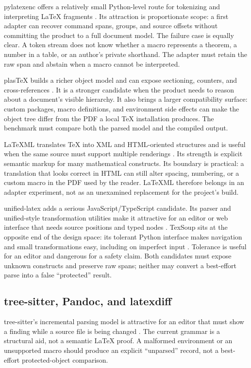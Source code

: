 pylatexenc offers a relatively small Python-level route for tokenizing and
interpreting LaTeX fragments \citep{pylatexenc2026}. Its attraction is
proportionate scope: a first adapter can recover command spans, groups, and
source offsets without committing the product to a full document model. The
failure case is equally clear. A token stream does not know whether a macro
represents a theorem, a number in a table, or an author's private shorthand.
The adapter must retain the raw span and abstain when a macro cannot be
interpreted.

plasTeX builds a richer object model and can expose sectioning, counters, and
cross-references \citep{plastex2026}. It is a stronger candidate when the
product needs to reason about a document's visible hierarchy. It also brings a
larger compatibility surface: custom packages, macro definitions, and
environment side effects can make the object tree differ from the PDF a local
TeX installation produces. The benchmark must compare both the parsed model
and the compiled output.

LaTeXML translates TeX into XML and HTML-oriented structures and is useful when
the same source must support multiple renderings \citep{latexml2026}. Its
strength is explicit semantic markup for many mathematical constructs. Its
boundary is practical: a translation that looks correct in HTML can still
alter spacing, numbering, or a custom macro in the PDF used by the reader.
LaTeXML therefore belongs in an adapter experiment, not as an unexamined
replacement for the project's build.

unified-latex adds a serious JavaScript/TypeScript candidate. Its parser and
unified-style transformation utilities make it attractive for an editor or web
interface that needs source positions and typed nodes
\citep{unifiedlatex2026}. TexSoup sits at the opposite end of the design space:
its tolerant Python interface makes navigation and small transformations easy,
including on imperfect input \citep{texsoup2026}. Tolerance is useful for an
editor and dangerous for a safety claim. Both candidates must expose unknown
constructs and preserve raw spans; neither may convert a best-effort parse into
a false ``protected'' result.

\subsection{tree-sitter, Pandoc, and latexdiff}

tree-sitter's incremental parsing model is attractive for an editor that must
show a finding while a source file is being changed
\citep{treesitterlatex2026}. The current grammar is a structural aid, not a
semantic LaTeX proof. A malformed environment or an unsupported macro should
produce an explicit ``unparsed'' record, not a best-effort protected-object
comparison.


